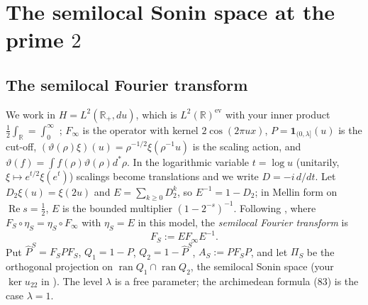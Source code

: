 \documentclass[11pt]{amsart}
\theoremstyle{definition}
\theoremstyle{remark}
\newcommand{\R}{\mathbb R}
\newcommand{\Rel}{\operatorname{Re}}
\newcommand{\ran}{\operatorname{ran}}
\newcommand{\Pih}{\widehat P}
\begin{document}
\section{The semilocal Sonin space at the prime $2$}\label{sec:semilocal}

\subsection{The semilocal Fourier transform}
We work in $H=L^2(\R_+,du)$, which is $L^2(\R)^{\mathrm{ev}}$ with your inner product $\frac12\int_\R=\int_0^\infty$
\cite[(16)]{CC2021}; $F_\infty$ is the operator with kernel $2\cos(2\pi ux)$, $P=\mathbf 1_{(0,\lambda]}(u)$ is the cut-off,
$(\vartheta(\rho)\xi)(u)=\rho^{-1/2}\xi(\rho^{-1}u)$ is the scaling action, and $\vartheta(f)=\int f(\rho)\vartheta(\rho)d^*\rho$.
In the logarithmic variable $t=\log u$ (unitarily, $\xi\mapsto e^{t/2}\xi(e^t)$) scalings become translations and we write
$D=-i\,d/dt$. Let $D_2\xi(u)=\xi(2u)$ and $E=\sum_{k\ge0}D_2^k$, so $E^{-1}=1-D_2$; in Mellin form on $\Rel s=\frac12$,
$E$ is the bounded multiplier $(1-2^{-s})^{-1}$. Following \cite[Prop.~4.1]{CCM2023}, where $F_S\circ\eta_S=\eta_S\circ F_\infty$
with $\eta_S=E$ in this model, the \emph{semilocal Fourier transform} is
\[
F_S:=EF_\infty E^{-1}.
\]
Put $\Pih^S=F_SPF_S$, $Q_1=1-P$, $Q_2=1-\Pih^S$, $A_S:=PF_SP$, and let $\Pi_S$ be the orthogonal projection on
$\ran Q_1\cap\ran Q_2$, the semilocal Sonin space (your $\ker u_{22}$ in \cite{CCquasi}). The level $\lambda$ is a free
parameter; the archimedean formula (83) is the case $\lambda=1$.
\end{document}
